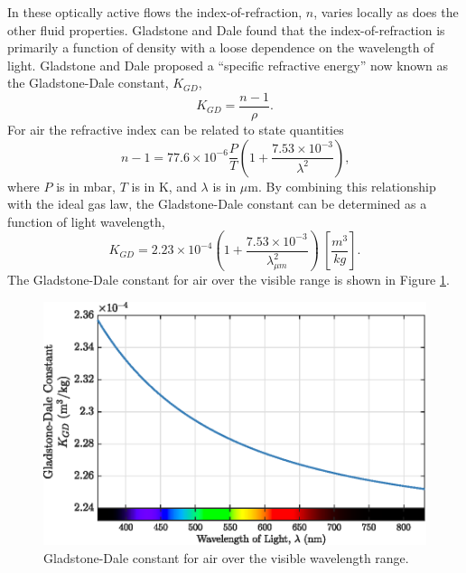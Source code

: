 In these optically active flows the index-of-refraction, $n$, varies locally as does the other fluid properties.
Gladstone and Dale \cite{Gladstone-1863-ND4wtDT9} found that the index-of-refraction is primarily a function of density with a loose dependence on the wavelength of light.
Gladstone and Dale proposed a ``specific refractive energy'' now known as the Gladstone-Dale constant, $K_{GD}$,
\begin{equation}
  K_{GD} = \frac{n-1}{\rho}\textrm{.}
  \label{eqn:02_gladstone_dale_constant}
\end{equation}
For air the refractive index can be related to state quantities \cite{Valley-1965-F3k3cmv6}
\begin{equation}
  n-1 = 77.6\times 10^{-6}\frac{P}{T}\left(1+\frac{7.53\times10^{-3}}{\lambda^2}\right)\textrm{,}
  \label{eqn:02_refractive_index_ptlambda}
\end{equation}
where $P$ is in mbar, $T$ is in K, and $\lambda$ is in $\mu$m.
By combining this relationship with the ideal gas law, the Gladstone-Dale constant can be determined as a function of light wavelength,
\begin{equation}
  K_{GD} = 2.23\times10^{-4}\left(1+\frac{7.53\times10^{-3}}{\lambda_{\mu m}^2}\right) \: \left[\frac{m^3}{kg}\right]\textrm{.}
  \label{eqn:02_gladstone_dale_wavelength}
\end{equation}
The Gladstone-Dale constant for air over the visible range is shown in Figure \ref{fig:02_gladstone_dale_wavelength}.
\begin{figure}
  \centering
  \includegraphics{../matlab/02_background/gladstone_dale_wavelength.eps}
  \caption{Gladstone-Dale constant for air over the visible wavelength range.}
  \label{fig:02_gladstone_dale_wavelength}
\end{figure}
